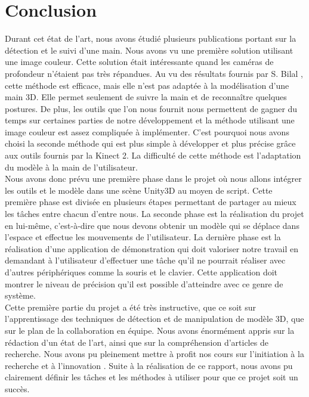 \chapter*{Conclusion}
Durant cet état de l'art, nous avons étudié plusieurs publications portant sur la détection et le suivi
d'une main. Nous avons vu une première solution utilisant une image couleur. Cette solution était
intéressante quand les caméras de profondeur n'étaient pas très répandues. Au vu des résultats fournis par S. Bilal
\cite{haarlike}, cette méthode est efficace, mais elle n'est pas adaptée à la modélisation d'une main 3D. Elle permet seulement
de suivre la main et de reconnaître quelques postures. De plus, les outils que l'on nous fournit nous permettent
de gagner du temps sur certaines parties de notre développement et la méthode utilisant une image couleur
est assez compliquée à implémenter. C'est pourquoi nous avons choisi la seconde méthode qui est plus
simple à développer et plus précise grâce aux outils fournis par la Kinect 2. La difficulté de cette méthode
est l'adaptation du modèle à la main de l'utilisateur.\\

Nous avons donc prévu une première phase dans le projet où nous allons intégrer les outils et le modèle
dans une scène Unity3D au moyen de script. Cette première phase est divisée en plusieurs étapes permettant
de partager au mieux les tâches entre chacun d'entre nous. La seconde phase est la réalisation du projet en lui-même, c'est-à-dire 
que nous devons obtenir un modèle qui se déplace dans l'espace et effectue les mouvements de l'utilisateur.
La dernière phase est la réalisation d'une application de démonstration qui doit valoriser notre travail
en demandant à l'utilisateur d'effectuer une tâche qu'il ne pourrait réaliser avec d'autres périphériques comme
la souris et le clavier. Cette application doit montrer le niveau de précision qu'il est possible d'atteindre
avec ce genre de système.\\

Cette première partie du projet a été très instructive, que ce soit sur l'apprentissage des techniques de détection et de manipulation
de modèle 3D, que sur le plan de la collaboration en équipe. Nous avons énormément appris sur la rédaction d'un
état de l'art, ainsi que sur la compréhension d'articles de recherche. Nous avons pu pleinement mettre à profit
nos cours sur \og l'initiation à la recherche et à l'innovation \fg. Suite à la réalisation de ce rapport, nous avons pu
clairement définir les tâches et les méthodes à utiliser pour que ce projet soit un succès. 
